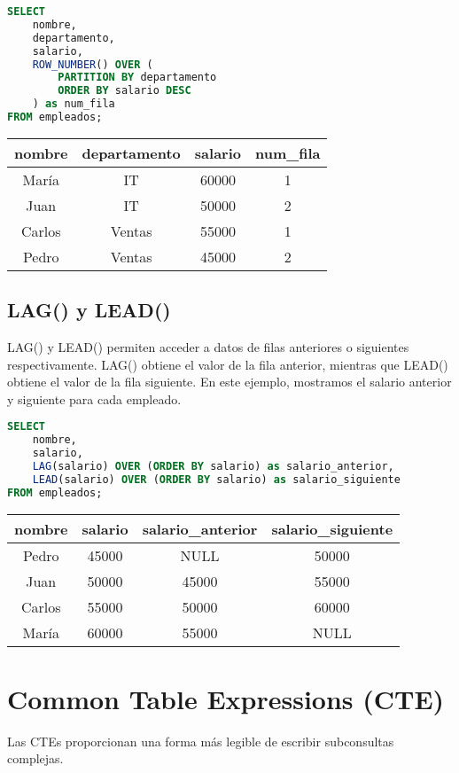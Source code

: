 \documentclass[12pt]{article}
\begin{document}
\begin{lstlisting}[language=SQL]
SELECT 
    nombre,
    departamento,
    salario,
    ROW_NUMBER() OVER (
        PARTITION BY departamento 
        ORDER BY salario DESC
    ) as num_fila
FROM empleados;
\end{lstlisting}

\begin{center}
\begin{tabular}{cccc}
\toprule
nombre & departamento & salario & num\_fila \\
\midrule
María & IT & 60000 & 1 \\
Juan & IT & 50000 & 2 \\
Carlos & Ventas & 55000 & 1 \\
Pedro & Ventas & 45000 & 2 \\
\bottomrule
\end{tabular}
\end{center}

\subsection{LAG() y LEAD()}
LAG() y LEAD() permiten acceder a datos de filas anteriores o siguientes respectivamente. LAG() obtiene el valor de la fila anterior, mientras que LEAD() obtiene el valor de la fila siguiente. En este ejemplo, mostramos el salario anterior y siguiente para cada empleado.

\begin{lstlisting}[language=SQL]
SELECT 
    nombre,
    salario,
    LAG(salario) OVER (ORDER BY salario) as salario_anterior,
    LEAD(salario) OVER (ORDER BY salario) as salario_siguiente
FROM empleados;
\end{lstlisting}

\begin{center}
\begin{tabular}{cccc}
\toprule
nombre & salario & salario\_anterior & salario\_siguiente \\
\midrule
Pedro & 45000 & NULL & 50000 \\
Juan & 50000 & 45000 & 55000 \\
Carlos & 55000 & 50000 & 60000 \\
María & 60000 & 55000 & NULL \\
\bottomrule
\end{tabular}
\end{center}

\section{Common Table Expressions (CTE)}
Las CTEs proporcionan una forma más legible de escribir subconsultas complejas.
\end{document}
